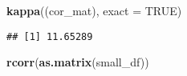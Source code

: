 \documentclass[]{article}
\newenvironment{Shaded}{\begin{snugshade}}{\end{snugshade}}
\newcommand{\DataTypeTok}[1]{\textcolor[rgb]{0.13,0.29,0.53}{#1}}
\newcommand{\KeywordTok}[1]{\textcolor[rgb]{0.13,0.29,0.53}{\textbf{#1}}}
\newcommand{\NormalTok}[1]{#1}
\newcommand{\OtherTok}[1]{\textcolor[rgb]{0.56,0.35,0.01}{#1}}
\begin{document}
\begin{Shaded}
\begin{Highlighting}[]
\KeywordTok{kappa}\NormalTok{((cor_mat), }\DataTypeTok{exact =} \OtherTok{TRUE}\NormalTok{)}
\end{Highlighting}
\end{Shaded}

\begin{verbatim}
## [1] 11.65289
\end{verbatim}

\begin{Shaded}
\begin{Highlighting}[]
\KeywordTok{rcorr}\NormalTok{(}\KeywordTok{as.matrix}\NormalTok{(small_df))}
\end{Highlighting}
\end{Shaded}
\end{document}
